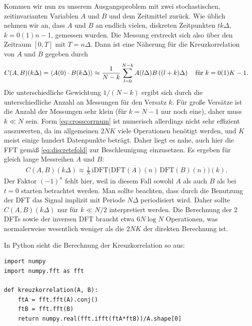 Kommen wir nun zu unserem Ausgangsproblem mit zwei stochastischen,
zeitinvarianten Variablen $A$ und $B$ und dem Zeitmittel zurück. Wie
üblich nehmen wir an, dass $A$ und $B$ an endlich vielen, diskreten
Zeitpunkten $tk\Delta$, $k=0(1)n-1$, gemessen wurden. Die Messung
erstreckt sich also über den Zeitraum $[0,T]$ mit $T=n\Delta$. Dann
ist eine Näherung für die Kreuzkorrelation von $A$ und $B$ gegeben
durch
\begin{equation}
  \label{eq:crosscorrnum}
  C(A,B)(k\Delta) = \left\langle{A(0)\cdot B(k\Delta)}\right\rangle
  \approx
  \frac{1}{N-k}\sum_{l=0}^{N-k}A(l\Delta)B\left((l+k)\Delta\right)
  \quad\text{für}\; k=0(1)K-1.
\end{equation}
Die unterschiedliche Gewichtung $1/(N-k)$ ergibt sich durch die
unterschiedliche Anzahl an Messungen für den Versatz $k$. Für große
Versätze ist die Anzahl der Messungen sehr klein (für $k=N-1$ nur noch
eine), daher muss $k \ll N$ sein. Form \eqref{eq:crosscorrnum} ist
numerisch allerdings nicht sehr effizient auszuwerten, da im
allgemeinen $2NK$ viele Operationen benötigt werden, und $K$ meist
einige hundert Datenpunkte beträgt.  Daher liegt es nahe, auch hier
die FFT gemäß \eqref{eq:discretefold} zur Beschleunigung einzusetzen.
Es ergeben für gleich lange Messreihen $A$ und $B$:
\begin{multline}
  \label{eq:crosscorrnumfft}
  C(A,B)(k\Delta)
  \approx
  \frac{1}{N}\,\text{iDFT}
  \bigl(\overline{\text{DFT}(A)(n)}\,\text{DFT}(B)(n)\bigr)(k).
\end{multline}
Der Faktor $(-1)^n$ fehlt hier, weil in diesem Fall sowohl $A$ als
auch $B$ als bei $t=0$ starten betrachtet werden. Man sollte beachten,
dass durch die Benutzung der DFT das Signal implizit mit Periode
$N\Delta$ periodisiert wird. Daher sollte $C(A,B)(k\Delta)$ nur für
$k\ll N/2$ interpretiert werden. Die Berechnung der 2 DFTs sowie der
inversen DFT braucht etwa $6 N\log N$ Operationen, was normalerweise
wesentlich weniger als die $2NK$ der direkten Berechnung ist.

In Python sieht die Berechnung der Kreuzkorrelation so aus:
\begin{lstlisting}
import numpy
import numpy.fft as fft

def kreuzkorrelation(A, B):
    ftA = fft.fft(A).conj()
    ftB = fft.fft(B)
    return numpy.real(fft.ifft(ftA*ftB))/A.shape[0]
\end{lstlisting}

